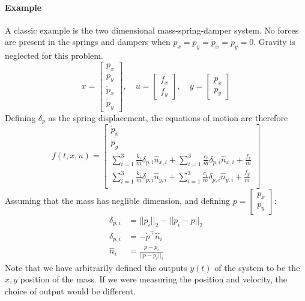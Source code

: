 \documentclass[../notes.tex]{subfiles}
\begin{document}
\paragraph{Example}
A classic example is the two dimensional mass-spring-damper system. No forces are present in the springs and dampers when $p_x = p_y = \dot{p}_x = \dot{p}_y = 0$. Gravity is neglected for this problem.
\begin{equation*}
    x = \begin{bmatrix}
        p_x \\ p_y \\ \dot{p}_x \\ \dot{p}_y
    \end{bmatrix}, \quad 
    u = \begin{bmatrix}
        f_x \\ f_y
    \end{bmatrix}, \quad
    y = \begin{bmatrix}
        p_x \\ p_y
    \end{bmatrix}
\end{equation*}
Defining $\delta_p$ as the spring displacement, the equations of motion are therefore
\begin{equation*}
    f(t,x,u) = \begin{bmatrix}
        \dot{p}_x \\
        \dot{p}_y \\
        \sum_{i=1}^3 \frac{k_i}{m}\delta_{p,i} \hat{n}_{x,i} + \sum_{i=1}^{3} \frac{c_i}{m}\delta_{\dot{p},i} \hat{n}_{x,i} + \frac{f_x}{m}\\
        \sum_{i=1}^3 \frac{k_i}{m}\delta_{p,i} \hat{n}_{y,i} + \sum_{i=1}^{3} \frac{c_i}{m}\delta_{\dot{p},i} \hat{n}_{y,i} + \frac{f_y}{m} \\
    \end{bmatrix}
\end{equation*}
Assuming that the mass has neglible dimension, and defining $p = \begin{bmatrix}
    p_x \\ p_y
\end{bmatrix}$:
\begin{align*}
    \delta_{p,i} &= ||p_i||_2 - ||p_i - p||_2 \\
    \delta_{\dot{p},i} &= -\dot{p}^\intercal \hat{n}_i \\
    \hat{n}_i &= \frac{p - p_i}{||p - p_i||_2}
\end{align*}
Note that we have arbitrarily defined the outputs $y(t)$ of the system to be the $x,y$ position of the mass. If we were measuring the position and velocity, the choice of output would be different.
\end{document}
